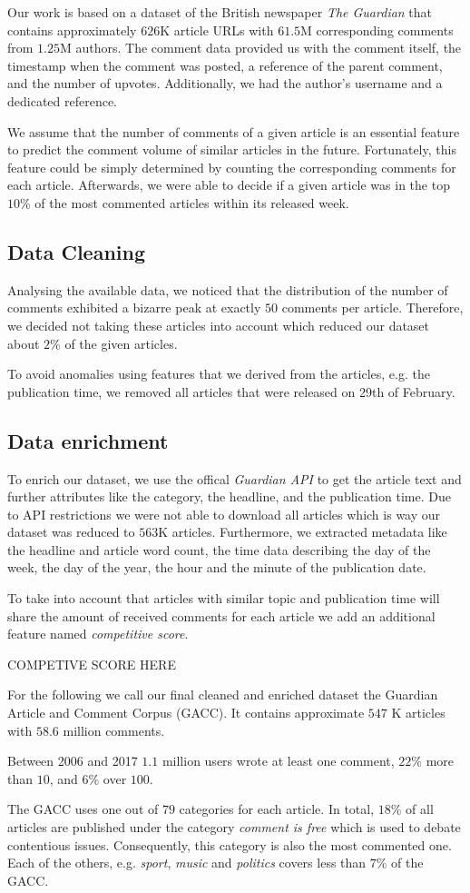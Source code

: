 Our work is based on a dataset of the British newspaper \textit{The Guardian} that contains approximately $626$K article URLs with $61.5$M corresponding comments from $1.25$M authors. 
The comment data provided us with the comment itself, the timestamp when the comment was posted, a reference of the parent comment, and the number of upvotes. Additionally, we had the author's username and a dedicated reference.

We assume that the number of comments of a given article is an essential feature to predict the comment volume of similar articles in the future. Fortunately, this feature could be simply determined by counting the corresponding comments for each article. Afterwards, we were able to decide if a given article was in the top $10$\% of the most commented articles within its released week.

\subsection{Data Cleaning}
Analysing the available data, we noticed that the distribution of the number of comments exhibited a bizarre peak at exactly $50$ comments per article. Therefore, we decided not taking these articles into account which reduced our dataset about $2$\% of the given articles.

To avoid anomalies using features that we derived from the articles, e.g. the publication time, we removed all articles that were released on 29th of February.

\subsection{Data enrichment}
To enrich our dataset, we use the offical \textit{Guardian API} to get the article text and further attributes like the category, the headline, and the publication time.
Due to API restrictions we were not able to download all articles which is way our dataset was reduced to $563$K articles.
Furthermore, we extracted metadata like the headline and article word count, the time data describing the day of the week, the day of the year, the hour and the minute of the publication date.

To take into account that articles with similar topic and publication time will share the amount of received comments for each article we add an additional feature named \textit{competitive score}. 

COMPETIVE SCORE HERE

For the following we call our final cleaned and enriched dataset the Guardian Article and Comment Corpus (GACC). It contains approximate $547$ K articles with $58.6$ million comments. 

Between 2006 and 2017 $1.1$ million users wrote at least one comment, $22$\% more than $10$, and $6$\% over $100$.

The GACC uses one out of $79$ categories for each article. In total, $18$\% of all articles are published under the category \textit{comment is free} which is used to debate contentious issues. Consequently, this category is also the most commented one. 
Each of the others, e.g. \textit{sport}, \textit{music} and \textit{politics} covers less than $7$\% of the GACC.